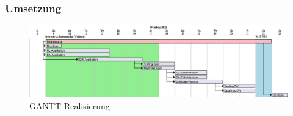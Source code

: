   \subsubsection{Umsetzung}
  \begin{figure}[H]
    \begin{center}
      \includegraphics[width=1\linewidth]{../content/diagrams/gantt/realizationPlanning/realizationPlanning.png}
      \caption{GANTT Realisierung}
    \end{center}
  \end{figure}
